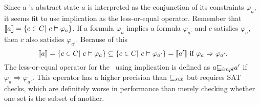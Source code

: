 Since a \constraintsCPA 's abstract state $a$ is interpreted as the conjunction of its constraints $\varphi_a$, it seems fit to use implication as the less-or-equal operator.
Remember that $\llbracket a \rrbracket = \{ c \in C |\ c \satisfies \varphi_a \}$.
If a formula $\varphi_a$ implies a formula $\varphi_{a'}$ and $c$ satisfies $\varphi_a$, then $c$ also satisfies $\varphi_{a'}$.
Because of this 
\[\llbracket a \rrbracket = \{ c \in C |\ c \vDash \varphi_a \} \subseteq \{ c \in C |\ c \vDash \varphi_{a'} \} = \llbracket a' \rrbracket \text{ if } \varphi_a \Rightarrow \varphi_{a'}.\]
The less-or-equal operator for the \constraintsCPA\ using implication is defined as $a {\sqsubseteq_{impl}} a'$ if $\varphi_a \Rightarrow \varphi_{a'}$.
This operator has a higher precision than ${\sqsubseteq_{sub}}$ but requires SAT checks, which are definitely worse in performance than merely checking whether one set is the subset of another.

